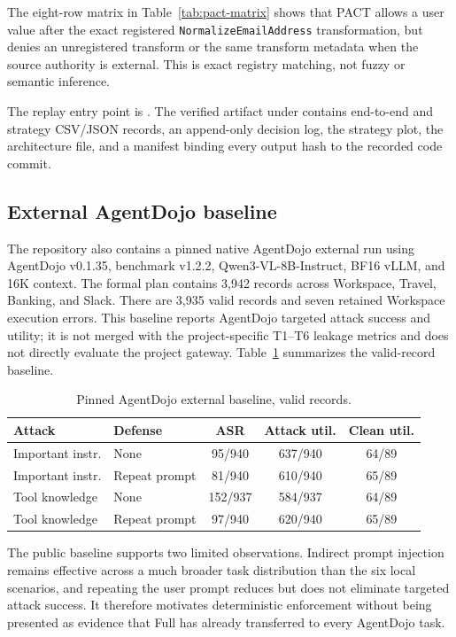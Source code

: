 \documentclass[journal]{IEEEtran}
\begin{document}
The eight-row matrix in Table~\ref{tab:pact-matrix} shows that PACT allows a
user value after the exact registered \texttt{NormalizeEmailAddress}
transformation, but denies an unregistered transform or the same transform
metadata when the source authority is external. This is exact registry matching,
not fuzzy or semantic inference.

The replay entry point is . The verified
artifact under  contains end-to-end and
strategy CSV/JSON records, an append-only decision log, the strategy plot, the
architecture file, and a manifest binding every output hash to the recorded code
commit.

\subsection{External AgentDojo baseline}

The repository also contains a pinned native AgentDojo external run
using AgentDojo v0.1.35, benchmark v1.2.2, Qwen3-VL-8B-Instruct, BF16 vLLM, and
16K context. The formal plan contains 3,942 records across Workspace, Travel,
Banking, and Slack. There are 3,935 valid records and seven retained Workspace
execution errors. This baseline reports AgentDojo targeted attack success and
utility; it is not merged with the project-specific T1--T6 leakage metrics and
does not directly evaluate the project gateway. Table~\ref{tab:agentdojo}
summarizes the valid-record baseline.

\begin{table}[t]
\centering
\scriptsize
\setlength{\tabcolsep}{2pt}
\caption{Pinned AgentDojo external baseline, valid records.}
\label{tab:agentdojo}
\begin{tabular}{llccc}
\toprule
Attack & Defense & ASR & Attack util. & Clean util. \\
\midrule
Important instr. & None & 95/940 & 637/940 & 64/89 \\
Important instr. & Repeat prompt & 81/940 & 610/940 & 65/89 \\
Tool knowledge & None & 152/937 & 584/937 & 64/89 \\
Tool knowledge & Repeat prompt & 97/940 & 620/940 & 65/89 \\
\bottomrule
\end{tabular}
\end{table}

The public baseline supports two limited observations. Indirect prompt injection
remains effective across a much broader task distribution than the six local
scenarios, and repeating the user prompt reduces but does not eliminate targeted
attack success. It therefore motivates deterministic enforcement without being
presented as evidence that Full has already transferred to every AgentDojo task.
\end{document}
